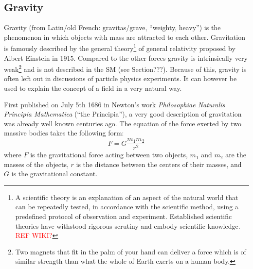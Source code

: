 
\subsection*{Gravity}
Gravity (from Latin/old French: gravitas/grave, ``weighty, heavy'') is the phenomenon in which objects with mass are attracted to each other. Gravitation is famously described by the general theory\footnote{A scientific theory is an explanation of an aspect of the natural world that can be repeatedly tested, in accordance with the scientific method, using a predefined protocol of observation and experiment. Established scientific theories have withstood rigorous scrutiny and embody scientific knowledge. \textcolor{red}{REF WIKI?}} of general relativity proposed by Albert Einstein in 1915. Compared to the other forces gravity is intrinsically very weak\footnote{Two magnets that fit in the palm of your hand can deliver a force which is of similar strength than what the whole of Earth exerts on a human body.} and is not described in the SM (see Section???). Because of this, gravity is often left out in discussions of particle physics experiments. It can however be used to explain the concept of a field in a very natural way.

First published on July 5th 1686 in Newton's work \textit{Philosophiae Naturalis Principia Mathematica} (``the Principia''), a very good description of gravitation was already well known centuries ago. The equation of the force exerted by two massive bodies takes the following form:
\begin{equation}
F = G \frac{m_1 m_2}{r^2}
\end{equation}
where $F$ is the gravitational force acting between two objects, $m_1$ and $m_2$ are the masses of the objects, $r$ is the distance between the centers of their masses, and $G$ is the gravitational constant.

